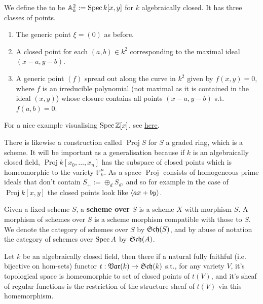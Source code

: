 \documentclass{article}
\begin{document}
\begin{example}
	We define the  to be $\mathbb{A}_k^2 := \operatorname{Spec} k[x,y]$ for $k$ algebraically closed. It has three classes of points. 
	\begin{enumerate}
		\item The generic point $\xi=(0)$ as before. 
		\item A closed point for each $(a,b) \in k^2$ corresponding to the maximal ideal $(x-a, y-b)$. 
		\item A generic point $(f)$ spread out along the curve in $k^2$ given by $f(x,y)=0$, where $f$ is an irreducible polynomial (not maximal as it is contained in the ideal $(x,y)$) whose closure contains all points $(x-a, y-b)$ s.t. $f(a,b)=0$. 
	\end{enumerate}
\end{example}

\begin{remark}
	For a nice example visualising $\operatorname{Spec} \mathbb{Z}[x]$, see \href{http://www.neverendingbooks.org/mumfords-treasure-map}{here}.
\end{remark}

\begin{remark}
	There is likewise a construction called $\operatorname{Proj}S$ for $S$ a graded ring, which is a scheme. It will be important as a generalisation because if $k$ is an algebraically closed field, $\operatorname{Proj} k[x_0, \dots, x_n]$ has the subspace of closed points which is homeomorphic to the variety $\mathbb{P}_k^n$. As a space $\operatorname{Proj}$ consists of homogeneous prime ideals that don't contain $S_+ := \oplus_d S_d$, and so for example in the case of $\operatorname{Proj}k[x,y]$ the closed points look like $\left\langle ax+by \right\rangle$.  
\end{remark}

\begin{definition}
Given a fixed scheme $S$, a \textbf{scheme over $S$} is a scheme $X$ with morphism $S$. A morphism of schemes over $S$ is a scheme morphism compatible with those to $S$. We denote the category of schemes over $S$ by $\mathfrak{Sch}(S)$, and by abuse of notation the category of schemes over $\operatorname{Spec} A$ by $\mathfrak{Sch}(A)$.	
\end{definition}

\begin{prop}
	Let $k$ be an algebraically closed field, then there if a natural fully faithful (i.e. bijective on hom-sets) functor $t: \mathfrak{Var}(k) \to \mathfrak{Sch}(k)$ s.t., for any variety $V$, it's topological space is homeomorphic to set of closed points of $t(V)$, and it's sheaf of regular functions is the restriction of the structure sheaf of $t(V)$ via this homemorphism. 
\end{prop}
\end{document}
